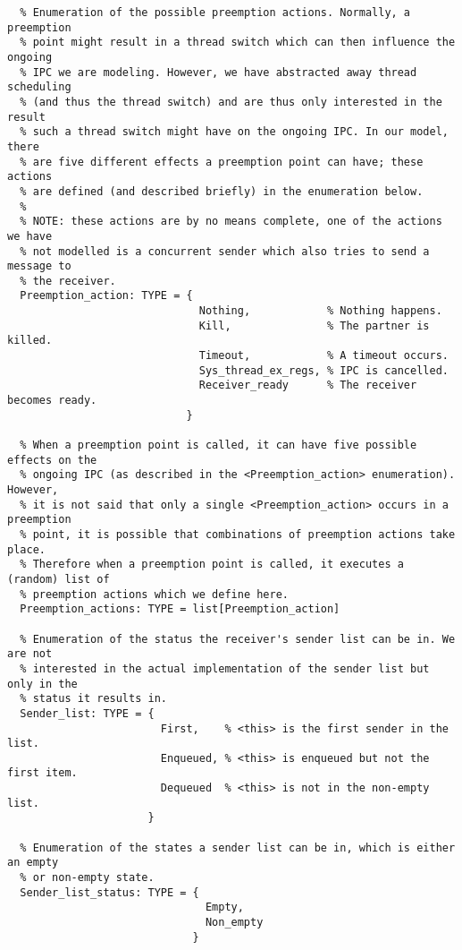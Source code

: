 \begin{lstlisting}
  % Enumeration of the possible preemption actions. Normally, a preemption 
  % point might result in a thread switch which can then influence the ongoing
  % IPC we are modeling. However, we have abstracted away thread scheduling 
  % (and thus the thread switch) and are thus only interested in the result
  % such a thread switch might have on the ongoing IPC. In our model, there
  % are five different effects a preemption point can have; these actions
  % are defined (and described briefly) in the enumeration below.
  %
  % NOTE: these actions are by no means complete, one of the actions we have
  % not modelled is a concurrent sender which also tries to send a message to
  % the receiver.
  Preemption_action: TYPE = {
                              Nothing,            % Nothing happens.
                              Kill,               % The partner is killed.
                              Timeout,            % A timeout occurs.
                              Sys_thread_ex_regs, % IPC is cancelled.
                              Receiver_ready      % The receiver becomes ready.
                            }

  % When a preemption point is called, it can have five possible effects on the
  % ongoing IPC (as described in the <Preemption_action> enumeration). However,
  % it is not said that only a single <Preemption_action> occurs in a preemption
  % point, it is possible that combinations of preemption actions take place.
  % Therefore when a preemption point is called, it executes a (random) list of
  % preemption actions which we define here.
  Preemption_actions: TYPE = list[Preemption_action]

  % Enumeration of the status the receiver's sender list can be in. We are not
  % interested in the actual implementation of the sender list but only in the
  % status it results in.
  Sender_list: TYPE = {
                        First,    % <this> is the first sender in the list.
                        Enqueued, % <this> is enqueued but not the first item.
                        Dequeued  % <this> is not in the non-empty list.
                      }

  % Enumeration of the states a sender list can be in, which is either an empty
  % or non-empty state.
  Sender_list_status: TYPE = {
                               Empty,
                               Non_empty
                             }
  

\end{lstlisting}
